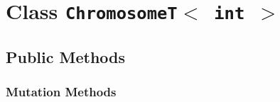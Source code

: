 \documentclass[12pt]{report}
\begin{document}
\newpage

\chapter{Class {\tt ChromosomeT$<$ int $>$}}


\section{Public Methods}

\subsection{Mutation Methods}

\vspace*{10pt}

\methodgrayfalse
\end{document}
